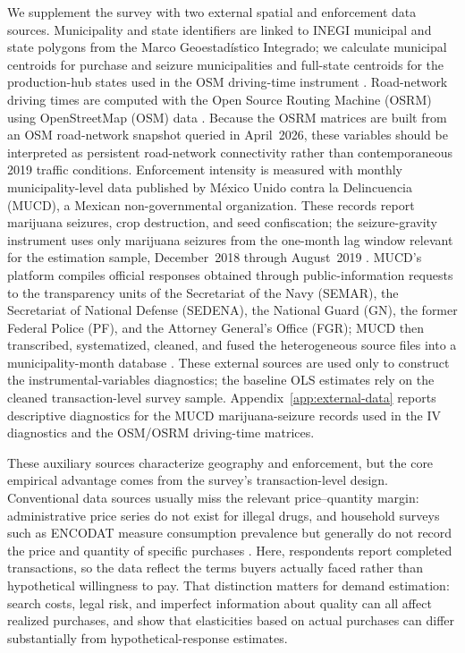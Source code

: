 We supplement the survey with two external spatial and enforcement data sources.  Municipality and state identifiers are linked to INEGI municipal and state polygons from the Marco Geoestad\'{i}stico Integrado; we calculate municipal centroids for purchase and seizure municipalities and full-state centroids for the production-hub states used in the OSM driving-time instrument \citep{inegi2022mgi}.  Road-network driving times are computed with the Open Source Routing Machine (OSRM) using OpenStreetMap (OSM) data \citep{openstreetmap2026,luxen2011osrm}.  Because the OSRM matrices are built from an OSM road-network snapshot queried in April~2026, these variables should be interpreted as persistent road-network connectivity rather than contemporaneous 2019 traffic conditions.  Enforcement intensity is measured with monthly municipality-level data published by M\'{e}xico Unido contra la Delincuencia (MUCD), a Mexican non-governmental organization.  These records report marijuana seizures, crop destruction, and seed confiscation; the seizure-gravity instrument uses only marijuana seizures from the one-month lag window relevant for the estimation sample, December~2018 through August~2019 \citep{mucd2019seizures}.  MUCD's platform compiles official responses obtained through public-information requests to the transparency units of the Secretariat of the Navy (SEMAR), the Secretariat of National Defense (SEDENA), the National Guard (GN), the former Federal Police (PF), and the Attorney General's Office (FGR); MUCD then transcribed, systematized, cleaned, and fused the heterogeneous source files into a municipality-month database \citep{mucd2019seizures}.  These external sources are used only to construct the instrumental-variables diagnostics; the baseline OLS estimates rely on the cleaned transaction-level survey sample.  Appendix~\ref{app:external-data} reports descriptive diagnostics for the MUCD marijuana-seizure records used in the IV diagnostics and the OSM/OSRM driving-time matrices.

These auxiliary sources characterize geography and enforcement, but the core empirical advantage comes from the survey's transaction-level design.  Conventional data sources usually miss the relevant price--quantity margin: administrative price series do not exist for illegal drugs, and household surveys such as ENCODAT measure consumption prevalence but generally do not record the price and quantity of specific purchases \citep{encodat2025}.  Here, respondents report completed transactions, so the data reflect the terms buyers actually faced rather than hypothetical willingness to pay.  That distinction matters for demand estimation: search costs, legal risk, and imperfect information about quality can all affect realized purchases, and \citet{nisbet1972ucla} show that elasticities based on actual purchases can differ substantially from hypothetical-response estimates.

